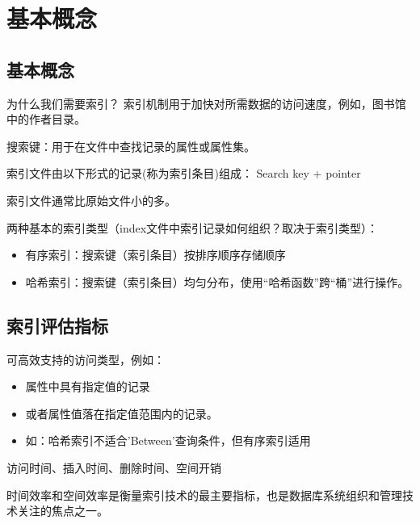 \section{基本概念}

\subsection{基本概念}

为什么我们需要索引？ 索引机制用于加快对所需数据的访问速度，例如，图书馆中的作者目录。

搜索键：用于在文件中查找记录的属性或属性集。

索引文件由以下形式的记录(称为索引条目)组成： Search key + pointer

索引文件通常比原始文件小的多。

两种基本的索引类型（index文件中索引记录如何组织？取决于索引类型）：

\begin{itemize}
    \item 有序索引：搜索键（索引条目）按排序顺序存储顺序
    \item 哈希索引：搜索键（索引条目）均匀分布，使用“哈希函数”跨“桶”进行操作。
\end{itemize}

\subsection{索引评估指标}

可高效支持的访问类型，例如：

\begin{itemize}
    \item 属性中具有指定值的记录
    \item 或者属性值落在指定值范围内的记录。
    \item 如：哈希索引不适合'Between'查询条件，但有序索引适用
\end{itemize}

访问时间、插入时间、删除时间、空间开销

时间效率和空间效率是衡量索引技术的最主要指标，也是数据库系统组织和管理技术关注的焦点之一。